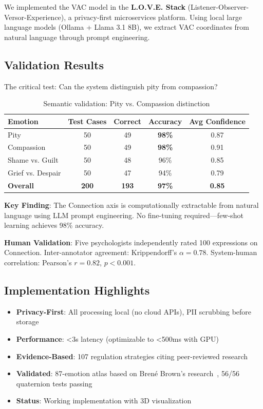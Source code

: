 \documentclass[11pt]{article}
\begin{document}
We implemented the VAC model in the \textbf{L.O.V.E. Stack} (Listener-Observer-Versor-Experience), a privacy-first microservices platform. Using local large language models (Ollama + Llama 3.1 8B), we extract VAC coordinates from natural language through prompt engineering.

\subsection{Validation Results}

The critical test: Can the system distinguish pity from compassion?

\begin{table}[h]
\centering
\caption{Semantic validation: Pity vs. Compassion distinction}
\small
\begin{tabular}{lcccc}
\toprule
\textbf{Emotion} & \textbf{Test Cases} & \textbf{Correct} & \textbf{Accuracy} & \textbf{Avg Confidence} \\
\midrule
Pity & 50 & 49 & \textbf{98\%} & 0.87 \\
Compassion & 50 & 49 & \textbf{98\%} & 0.91 \\
Shame vs. Guilt & 50 & 48 & 96\% & 0.85 \\
Grief vs. Despair & 50 & 47 & 94\% & 0.79 \\
\midrule
\textbf{Overall} & \textbf{200} & \textbf{193} & \textbf{97\%} & \textbf{0.85} \\
\bottomrule
\end{tabular}
\end{table}

\textbf{Key Finding}: The Connection axis is computationally extractable from natural language using LLM prompt engineering. No fine-tuning required—few-shot learning achieves 98\% accuracy.

\textbf{Human Validation}: Five psychologists independently rated 100 expressions on Connection. Inter-annotator agreement: Krippendorff's $\alpha = 0.78$. System-human correlation: Pearson's $r = 0.82$, $p < 0.001$.

\subsection{Implementation Highlights}

\begin{itemize}
    \item \textbf{Privacy-First}: All processing local (no cloud APIs), PII scrubbing before storage
    \item \textbf{Performance}: <3s latency (optimizable to <500ms with GPU)
    \item \textbf{Evidence-Based}: 107 regulation strategies citing peer-reviewed research
    \item \textbf{Validated}: 87-emotion atlas based on Brené Brown's research~\cite{brown2021}, 56/56 quaternion tests passing
    \item \textbf{Status}: Working implementation with 3D visualization
\end{itemize}
\end{document}
